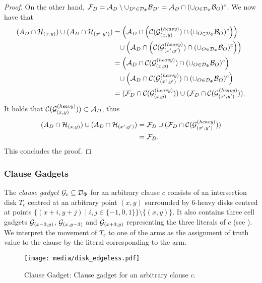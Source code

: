 \begin{toappendix}
\begin{toappendix}
\begin{proof}
    On the other hand, $\mathcal{F}_D = \mathcal{A}_D \setminus \cup_{D' \in \mathcal{D}_\Phi} \mathcal{B}_{D'} = \mathcal{A}_D \cap (\cup_{O \in \mathcal{D}_\Phi} \mathcal{B}_{O})^c$. We now have that
    \begin{align*}
        (A_D \cap \mathcal{H}_{(x,y)}) \cup (A_D \cap \mathcal{H}_{(x',y')}) & = \left(\mathcal{A}_D \cap \left(\mathcal{C}(\mathcal{G}_{(x,y)}^{(\mathit{heavy})}) \cap (\cup_{O \in \mathcal{D}_\Phi} \mathcal{B}_{O})^c\right)\right)\\
        &\phantom{=}\cup \left(\mathcal{A}_D \cap \left(\mathcal{C}(\mathcal{G}_{(x',y')}^{(\mathit{heavy})}) \cap (\cup_{O \in \mathcal{D}_\Phi} \mathcal{B}_{O})^c\right)\right) \\
        & = \left(\mathcal{A}_D \cap \mathcal{C}(\mathcal{G}_{(x,y)}^{(\mathit{heavy})}) \cap (\cup_{O \in \mathcal{D}_\Phi} \mathcal{B}_{O})^c\right)\\
        &\phantom{=} \cup \left(\mathcal{A}_D \cap \mathcal{C}(\mathcal{G}_{(x',y')}^{(\mathit{heavy})}) \cap (\cup_{O \in \mathcal{D}_\Phi} \mathcal{B}_{O})^c\right)\\
        & =(\mathcal{F}_D \cap \mathcal{C}(\mathcal{G}_{(x,y)}^{(\mathit{heavy})}))\cup (\mathcal{F}_D \cap \mathcal{C}(\mathcal{G}_{(x',y')}^{(\mathit{heavy})})).
    \end{align*}
    It holds that $\mathcal{C}(\mathcal{G}_{(x,y)}^{(\mathit{heavy})})) \subset \mathcal{A}_D$, thus
    \begin{align*}
        (A_D \cap \mathcal{H}_{(x,y)}) \cup (A_D \cap \mathcal{H}_{(x',y')}) & =\mathcal{F}_D \cup (\mathcal{F}_D \cap \mathcal{C}(\mathcal{G}_{(x',y')}^{(\mathit{heavy})}))\\
        & = \mathcal{F}_D.
    \end{align*}
    This concludes the proof.
\end{proof}

\subsubsection{Clause Gadgets}

The \emph{clause gadget} $\mathcal{G}_c \subseteq \mathcal{D}_\Phi$ for an arbitrary clause $c$ consists of an intersection disk $T_c$ centred at an arbitrary point $(x,y)$ surrounded by $6$-heavy disks centred at points $\{(x+i,y+j)\mid i,j\in \{-1,0,1\}\}\setminus\{(x,y)\}$.
It also contains three cell gadgets $\mathcal{G}_{(x-3,y)}$, $\mathcal{G}_{(x,y-3)}$ and $\mathcal{G}_{(x+3,y)}$ representing the three literals of $c$ (see ).
We interpret the movement of $T_c$ to one of the arms as the assignment of truth value to the clause by the literal corresponding to the arm. 

\begin{figure}[!b]
    \centering
    \texttt{[image: media/disk\_edgeless.pdf]}
    \caption{Clause Gadget: Clause gadget for an arbitrary clause $c$.}
    \label{fig:clause_gadget}
\end{figure}



\end{toappendix}
\end{toappendix}
